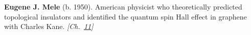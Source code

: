 \textbf{Eugene J. Mele} (b. 1950). American physicist who theoretically predicted topological insulators and identified the quantum spin Hall effect in graphene with Charles Kane. \emph{[Ch.~\hyperref[ch:topologicalinsulators]{11}]}

